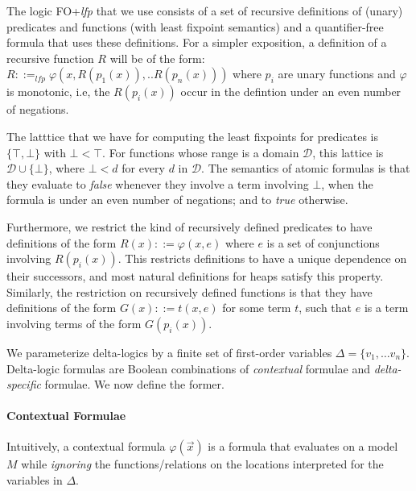 The logic FO+\textit{lfp} that we use consists of a set of recursive definitions of (unary) predicates and functions (with least
fixpoint semantics) and a quantifier-free formula that uses these definitions. For a simpler exposition, a definition of a recursive function $R$ will be of the form:
$R ::=_{lfp} \varphi(x, R(p_1(x)),..R(p_n(x)))$
where $p_i$ are unary functions and $\varphi{}$ is monotonic, i.e, the $R(p_i(x))$ occur in the defintion under an even number of negations. 

The latttice that we have for computing the least fixpoints for predicates is $\{\top{}, \bot{} \}$ with $\bot{} < \top{}$. For functions whose range is a domain $\mathcal{D}$, this lattice is $\mathcal{D} \cup{} \{\bot{}\}$, where $\bot{} < d$ for every $d$ in $\mathcal{D}$. The semantics of atomic formulas is that they evaluate to \textit{false} whenever they involve a term involving $\bot{}$, when the formula is under an even number of negations; and to \textit{true} otherwise.

Furthermore, we restrict the kind of recursively defined predicates to have definitions of the form $R(x) ::= \varphi(x, e)$ where $e$ is a set of conjunctions involving $R(p_i(x))$. 
This restricts definitions to have a unique dependence on their successors, and most natural definitions for heaps satisfy this property. Similarly, the restriction on recursively defined functions is that they have definitions of the form $G(x) ::= t(x, e)$ for some term $t$, such that $e$ is a term involving terms of the form $G(p_i(x))$.

We parameterize delta-logics by a finite set of first-order variables 
$\Delta = \{ v_1, \ldots v_n\}$.
Delta-logic formulas are Boolean combinations of \emph{contextual} formulae and \emph{delta-specific} formulae.
We now define the former.

\paragraph{Contextual Formulae}
Intuitively, a contextual formula $\varphi(\vec{x})$ is a formula that evaluates
on a model $M$ while \emph{ignoring} the functions/relations on the locations interpreted
for the variables in $\Delta$. 

